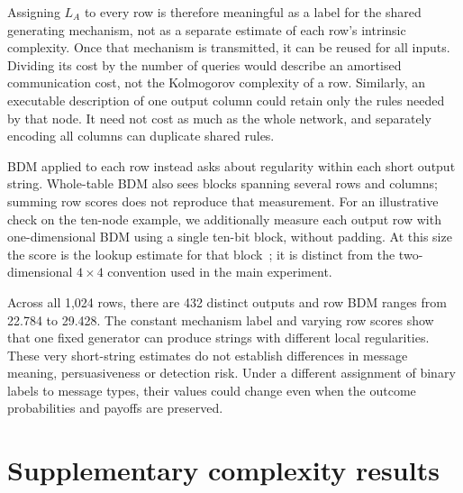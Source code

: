 \documentclass[11pt,a4paper]{article}
\begin{document}
Assigning $L_A$ to every row is therefore meaningful as a label for the
shared generating mechanism, not as a separate estimate of each row's
intrinsic complexity. Once that mechanism is transmitted, it can be reused
for all inputs. Dividing its cost by the number of queries would describe
an amortised communication cost, not the Kolmogorov complexity of a row.
Similarly, an executable description of one output column could retain
only the rules needed by that node. It need not cost as much as the
whole network, and separately encoding all columns can duplicate shared
rules.

BDM applied to each row instead asks about regularity within each short
output string. Whole-table BDM also sees blocks spanning several rows
and columns; summing row scores does not reproduce that measurement.
For an illustrative check on the ten-node example, we additionally
measure each output row with one-dimensional BDM using a single ten-bit
block, without padding. At this size the score is the lookup estimate
for that block~\cite{pybdm}; it is distinct from the two-dimensional
$4\times4$ convention used in the main experiment.

\begin{table}[htbp]\centering\small

\caption{What remains fixed when output strings differ? Selected input
addresses identify rows in the same ten-node network. Row BDM evaluates
the displayed ten-bit string. The last column repeats the 325-bit
network programme length as a mechanism label; it is not a measured
minimum description length of that row. Inputs 65 and 321 give the same
output and therefore the same row score.}
\label{tab:rowcomplexity}
\end{table}

Across all 1,024 rows, there are 432 distinct outputs and row BDM ranges
from 22.784 to 29.428. The constant mechanism label and varying row scores
show that one fixed generator can produce strings with different local
regularities. These very short-string estimates do not establish
differences in message meaning, persuasiveness or detection risk. Under
a different assignment of binary labels to message types, their
values could change even when the outcome probabilities and payoffs are
preserved.

\section{Supplementary complexity results}\label{app:complexity-results}
\end{document}
